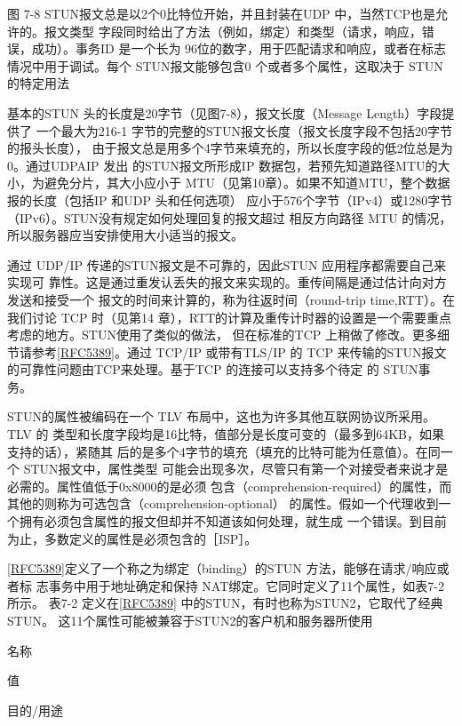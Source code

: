 图 7-8
STUN报文总是以2个0比特位开始，并且封装在UDP 中，当然TCP也是允许的。报文类型
字段同时给出了方法（例如，绑定）和类型（请求，响应，错误，成功）。事务ID 是一个长为
96位的数字，用于匹配请求和响应，或者在标志情况中用于调试。每个 STUN报文能够包含0
个或者多个属性，这取决于 STUN 的特定用法

基本的STUN 头的长度是20字节（见图7-8），报文长度（Message Length）字段提供了
一个最大为216-1 字节的完整的STUN报文长度（报文长度字段不包括20字节的报头长度），
由于报文总是用多个4字节来填充的，所以长度字段的低2位总是为0。通过UDPAIP 发出
的STUN报文所形成IP 数据包，若预先知道路径MTU的大小，为避免分片，其大小应小于
MTU（见第10章）。如果不知道MTU，整个数据报的长度（包括IP 和UDP 头和任何选项）
应小于576个字节（IPv4）或1280字节（IPv6）。STUN没有规定如何处理回复的报文超过
相反方向路径 MTU 的情况，所以服务器应当安排使用大小适当的报文。

通过 UDP/IP 传递的STUN报文是不可靠的，因此STUN 应用程序都需要自己来实现可
靠性。这是通过重发认丢失的报文来实现的。重传间隔是通过估计向对方发送和接受一个
报文的时间来计算的，称为往返时间（round-trip time,RTT）。在我们讨论 TCP 时（见第14
章），RTT的计算及重传计时器的设置是一个需要重点考虑的地方。STUN使用了类似的做法，
但在标准的TCP 上稍做了修改。更多细节请参考\href{https://www.rfc-editor.org/rfc/rfc5389}{[RFC5389]}。通过 TCP/IP 或带有TLS/IP 的
TCP 来传输的STUN报文的可靠性问题由TCP来处理。基于TCP 的连接可以支持多个待定
的 STUN事务。

STUN的属性被编码在一个 TLV 布局中，这也为许多其他互联网协议所采用。TLV 的
类型和长度字段均是16比特，值部分是长度可变的（最多到64KB，如果支持的话），紧随其
后的是多个4字节的填充（填充的比特可能为任意值）。在同一个 STUN报文中，属性类型
可能会出现多次，尽管只有第一个对接受者来说才是必需的。属性值低于0x8000的是必须
包含（comprehension-required）的属性，而其他的则称为可选包含（comprehension-optional）
的属性。假如一个代理收到一个拥有必须包含属性的报文但却并不知道该如何处理，就生成
一个错误。到目前为止，多数定义的属性是必须包含的［ISP］。

\href{https://www.rfc-editor.org/rfc/rfc5389}{[RFC5389]}定义了一个称之为绑定（binding）的STUN 方法，能够在请求/响应或者标
志事务中用于地址确定和保持 NAT绑定。它同时定义了11个属性，如表7-2所示。
表7-2 定义在\href{https://www.rfc-editor.org/rfc/rfc5389}{[RFC5389]} 中的STUN，有时也称为STUN2，它取代了经典 STUN。
这11个属性可能被兼容于STUN2的客户机和服务器所使用

名称

值

目的/用途

